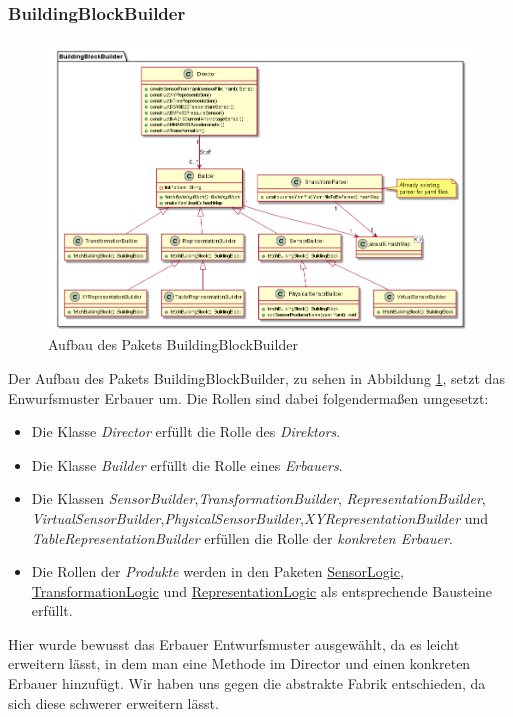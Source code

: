 \documentclass[parskip=full]{scrartcl}
\begin{document}
\subsubsection{BuildingBlockBuilder}
\begin{figure}[htbp]
	\begin{center}
		\includegraphics[width = 16cm]{Grafiken/BuildingBlockBuilder.PNG}
		\caption{Aufbau des Pakets BuildingBlockBuilder}
		\label{BuildingBlockBuilder}
	\end{center}
\end{figure}

Der Aufbau des Pakets BuildingBlockBuilder, zu sehen in Abbildung \ref{BuildingBlockBuilder}, setzt das Enwurfsmuster Erbauer um. Die Rollen sind dabei folgendermaßen umgesetzt:
\begin{itemize}

\item Die Klasse \textit{Director} erfüllt die Rolle des \textit{Direktors}.
\item Die Klasse \textit{Builder} erfüllt die Rolle eines \textit{Erbauers}.
\item Die Klassen \textit{SensorBuilder},\textit{TransformationBuilder}, \textit{RepresentationBuilder},
\textit{VirtualSensorBuilder},\textit{PhysicalSensorBuilder},\textit{XYRepresentationBuilder} und \textit{TableRepresentationBuilder}  erfüllen die Rolle der \textit{konkreten Erbauer}.
\item Die Rollen der \textit{Produkte} werden in den Paketen \hyperlink{SensorLogic}{SensorLogic}, \hyperlink{TransformationLogic}{TransformationLogic} und \hyperlink{RepresentationLogic}{RepresentationLogic} als entsprechende Bausteine erfüllt.

\end{itemize} 
Hier wurde bewusst das Erbauer Entwurfsmuster ausgewählt, da es leicht erweitern lässt, in dem man eine Methode im Director und einen konkreten Erbauer hinzufügt. Wir haben uns gegen die abstrakte Fabrik entschieden, da sich diese schwerer erweitern lässt.
\end{document}
